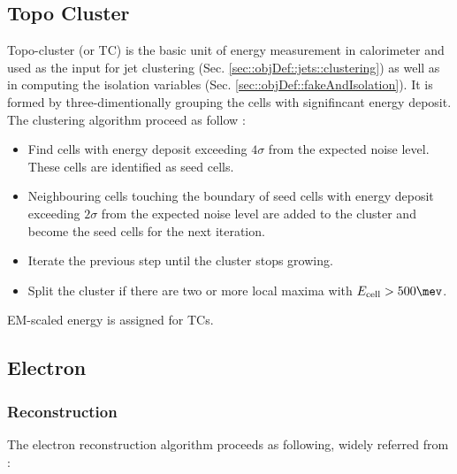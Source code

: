 \subsection{Topo Cluster} \label{sec::objDef::TopoCluster}
Topo-cluster (or TC) is the basic unit of energy measurement in calorimeter and used as the input for jet clustering  (Sec. \ref{sec::objDef::jets::clustering}) as well as in computing the isolation variables (Sec. \ref{sec::objDef::fakeAndIsolation}). 
It is formed by three-dimentionally grouping the cells with signifincant energy deposit.
The clustering algorithm proceed as follow \cite{138_topoClustering_Run1}:
\begin{itemize}
\item Find cells with energy deposit exceeding $4\sigma$ from the expected noise level. These cells are identified as seed cells.
\item Neighbouring cells touching the boundary of seed cells with energy deposit exceeding $2\sigma$ from the expected noise level are added to the cluster and become the seed cells for the next iteration.
\item Iterate the previous step until the cluster stops growing.
\item Split the cluster if there are two or more local maxima with $E_{\mathrm{cell}}>500\mev$.
\end{itemize}
EM-scaled energy is assigned for TCs. \\




\subsection{Electron} \label{sec::objDef::electrons}

\subsubsection{Reconstruction} \label{sec::objDef::electrons::reco}
The electron reconstruction algorithm proceeds as following, widely referred from \cite{156_ElectronEffMeas_2015data}: 

